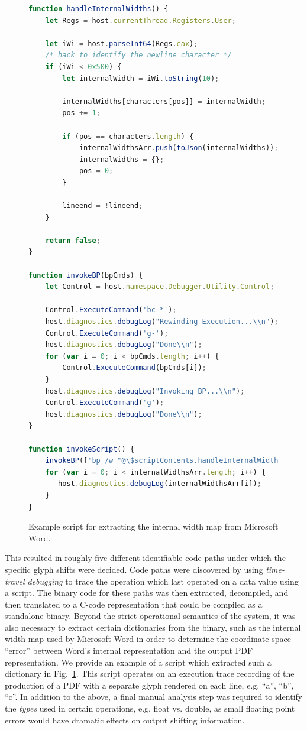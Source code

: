 \begin{figure}
\begin{lstlisting}[language=JavaScript]
function handleInternalWidths() {
    let Regs = host.currentThread.Registers.User;

    let iWi = host.parseInt64(Regs.eax);
    /* hack to identify the newline character */
    if (iWi < 0x500) {
        let internalWidth = iWi.toString(10);

        internalWidths[characters[pos]] = internalWidth;
        pos += 1;

        if (pos == characters.length) {
            internalWidthsArr.push(toJson(internalWidths));
            internalWidths = {};
            pos = 0;
        }

        lineend = !lineend;
    }

    return false;
}

function invokeBP(bpCmds) {
    let Control = host.namespace.Debugger.Utility.Control;

    Control.ExecuteCommand('bc *');
    host.diagnostics.debugLog("Rewinding Execution...\\n");
    Control.ExecuteCommand('g-');
    host.diagnostics.debugLog("Done\\n");
    for (var i = 0; i < bpCmds.length; i++) {
        Control.ExecuteCommand(bpCmds[i]);
    }
    host.diagnostics.debugLog("Invoking BP...\\n");
    Control.ExecuteCommand('g');
    host.diagnostics.debugLog("Done\\n");
}

function invokeScript() {
    invokeBP(['bp /w "@\$scriptContents.handleInternalWidths()" 0x65567138']);
    for (var i = 0; i < internalWidthsArr.length; i++) {
       host.diagnostics.debugLog(internalWidthsArr[i]);
    }
}
\end{lstlisting}
\caption{Example script for extracting the internal width map from Microsoft Word.}
\label{fig:extraction-script}
\end{figure}

This resulted in roughly five different identifiable code paths under which the specific glyph shifts were decided.
Code paths were discovered by using \emph{time-travel debugging} to trace the operation which last operated on a data value using a script.
The binary code for these paths was then extracted, decompiled, and then translated to a C-code representation that could be compiled as a standalone binary.
Beyond the strict operational semantics of the system, it was also necessary to extract certain dictionaries from the binary, such as the internal width map used by Microsoft Word in order to determine the coordinate space ``error'' between Word's internal representation and the output PDF representation.
We provide an example of a script which extracted such a dictionary in Fig.~\ref{fig:extraction-script}.
This script operates on an execution trace recording of the production of a PDF with a separate glyph rendered on each line, e.g. ``a'', ``b'', ``c''.
In addition to the above, a final manual analysis step was required to identify the \emph{types} used in certain operations, e.g. float vs. double, as small floating point errors would have dramatic effects on output shifting information.

